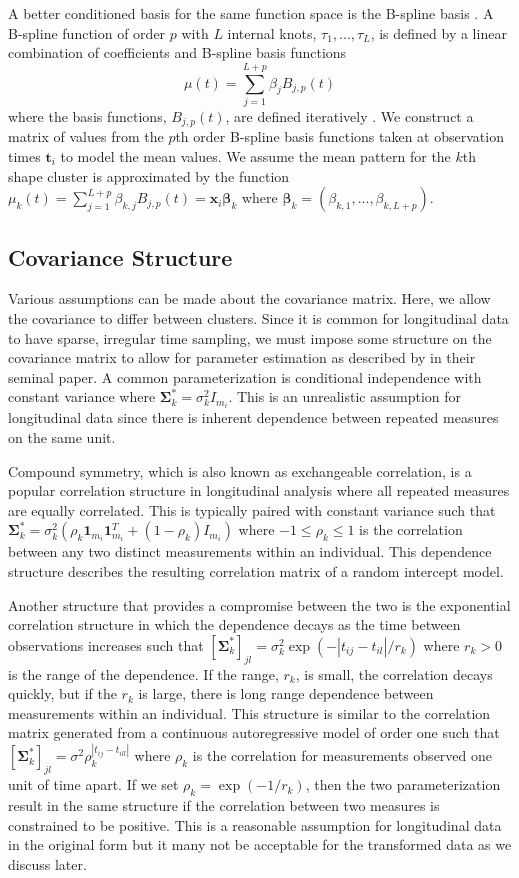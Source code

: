 \documentclass[12pt]{article}
\newcommand{\B}[0]{\mathbf}
\newcommand{\bs}[0]{\boldsymbol}
\begin{document}
A better conditioned basis for the same function space is the B-spline basis \cite{deboor1978, schumaker1981,curry1966, de1976}. A B-spline function of order $p$ with $L$ internal knots, $\tau_{1},...,\tau_{L}$, is defined by a linear combination of coefficients and B-spline basis functions
$$\mu(t) = \sum^{L+p}_{j=1} \beta_j B_{j,p}(t)$$
where the basis functions, $B_{j,p}(t)$, are defined iteratively \cite{deboor1972,cox1972}. We construct a matrix  of values from the $p$th order B-spline basis functions taken at observation times $\B t_{i}$ to model the mean values. We assume the mean pattern for the $k$th shape cluster is approximated by the function $\mu_{k}(t)=\sum^{L+p}_{j=1} \beta_{k,j} B_{j,p}(t) = \B x_{i}\bs\beta_{k}$ where $\bs\beta_{k}=(\beta_{k,1},...,\beta_{k, L+p}).$  

\subsection{Covariance Structure}
Various assumptions can be made about the covariance matrix. Here, we allow the covariance to differ between clusters. Since it is common for longitudinal data to have sparse, irregular time sampling, we must impose some structure on the covariance matrix to allow for parameter estimation as described by \textcite{jennrich1986} in their seminal paper. A common parameterization is conditional independence with constant variance where $\B \Sigma^{*}_{k}= \sigma_{k}^{2}I_{m_{i}}$. This is an unrealistic assumption for longitudinal data since there is inherent dependence between repeated measures on the same unit. 

Compound symmetry, which is also known as exchangeable correlation, is a popular correlation structure in longitudinal analysis where all repeated measures are equally correlated. This is typically paired with constant variance such that $\B \Sigma^{*}_{k} = \sigma_{k}^{2}(\rho_{k}\B1_{m_{i}}\B1_{m_{i}}^{T}+(1-\rho_{k})I_{m_{i}})$ where $-1\leq\rho_{k}\leq 1$ is the correlation between any two distinct measurements within an individual. This dependence structure describes the resulting correlation matrix of a random intercept model.

Another structure that provides a compromise between the two is the exponential correlation structure in which the dependence decays as the time between observations increases such that $[\B \Sigma^{*}_{k}]_{jl} = \sigma_{k}^{2}\exp(-| t_{ij}-t_{il}| / r_{k})$ where $r_{k}> 0$ is the range of the dependence. If the range, $r_{k}$, is small, the correlation decays quickly, but if the $r_{k}$ is large, there is long range dependence between measurements within an individual. This structure is similar to the correlation matrix generated from a continuous autoregressive model of order one such that $[\B\Sigma^{*}_{k}]_{jl} = \sigma^{2}\rho_{k}^{|t_{ij}-t_{ill}|}$ where $\rho_{k}$ is the correlation for measurements observed one unit of time apart. If we set $\rho_{k} = \exp(-1/r_{k})$, then the two parameterization result in the same structure if the correlation between two measures is constrained to be positive. This is a reasonable assumption for longitudinal data in the original form but it many not be acceptable for the transformed data as we discuss later.
\end{document}
